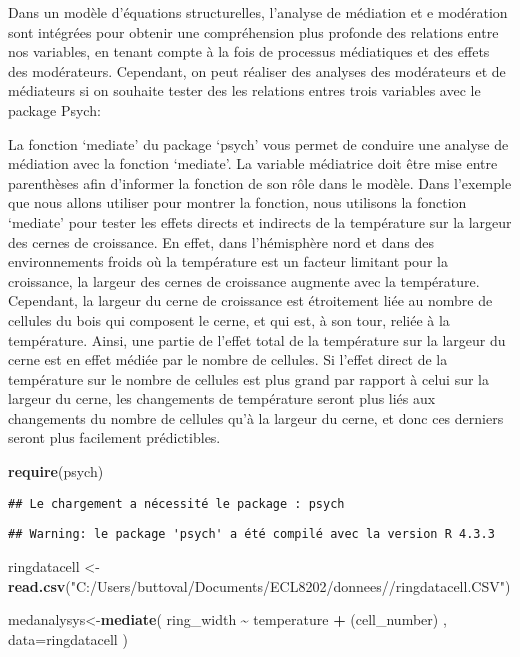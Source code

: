 \documentclass[
]{article}
\newenvironment{Shaded}{\begin{snugshade}}{\end{snugshade}}
\newcommand{\AttributeTok}[1]{\textcolor[rgb]{0.13,0.29,0.53}{#1}}
\newcommand{\FunctionTok}[1]{\textcolor[rgb]{0.13,0.29,0.53}{\textbf{#1}}}
\newcommand{\NormalTok}[1]{#1}
\newcommand{\OtherTok}[1]{\textcolor[rgb]{0.56,0.35,0.01}{#1}}
\newcommand{\SpecialCharTok}[1]{\textcolor[rgb]{0.81,0.36,0.00}{\textbf{#1}}}
\newcommand{\StringTok}[1]{\textcolor[rgb]{0.31,0.60,0.02}{#1}}
\begin{document}
Dans un modèle d'équations structurelles, l'analyse de médiation et e
modération sont intégrées pour obtenir une compréhension plus profonde
des relations entre nos variables, en tenant compte à la fois de
processus médiatiques et des effets des modérateurs. Cependant, on peut
réaliser des analyses des modérateurs et de médiateurs si on souhaite
tester des les relations entres trois variables avec le package Psych:

La fonction `mediate' du package `psych' vous permet de conduire une
analyse de médiation avec la fonction `mediate'. La variable médiatrice
doit être mise entre parenthèses afin d'informer la fonction de son rôle
dans le modèle. Dans l'exemple que nous allons utiliser pour montrer la
fonction, nous utilisons la fonction `mediate' pour tester les effets
directs et indirects de la température sur la largeur des cernes de
croissance. En effet, dans l'hémisphère nord et dans des environnements
froids où la température est un facteur limitant pour la croissance, la
largeur des cernes de croissance augmente avec la température.
Cependant, la largeur du cerne de croissance est étroitement liée au
nombre de cellules du bois qui composent le cerne, et qui est, à son
tour, reliée à la température. Ainsi, une partie de l'effet total de la
température sur la largeur du cerne est en effet médiée par le nombre de
cellules. Si l'effet direct de la température sur le nombre de cellules
est plus grand par rapport à celui sur la largeur du cerne, les
changements de température seront plus liés aux changements du nombre de
cellules qu'à la largeur du cerne, et donc ces derniers seront plus
facilement prédictibles.

\begin{Shaded}
\begin{Highlighting}[]
\FunctionTok{require}\NormalTok{(psych)}
\end{Highlighting}
\end{Shaded}

\begin{verbatim}
## Le chargement a nécessité le package : psych
\end{verbatim}

\begin{verbatim}
## Warning: le package 'psych' a été compilé avec la version R 4.3.3
\end{verbatim}

\begin{Shaded}
\begin{Highlighting}[]
\NormalTok{ringdatacell }\OtherTok{\textless{}{-}} \FunctionTok{read.csv}\NormalTok{(}\StringTok{"C:/Users/buttoval/Documents/ECL8202/donnees//ringdatacell.CSV"}\NormalTok{)}


\NormalTok{medanalysys}\OtherTok{\textless{}{-}}\FunctionTok{mediate}\NormalTok{( ring\_width }\SpecialCharTok{\textasciitilde{}}\NormalTok{ temperature }\SpecialCharTok{+}\NormalTok{ (cell\_number) , }\AttributeTok{data=}\NormalTok{ringdatacell )}
\end{Highlighting}
\end{Shaded}
\end{document}
